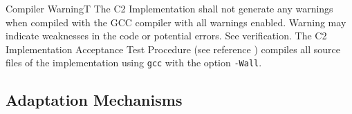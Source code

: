 \documentclass{pnp_article}
\begin{document}
\begin{fwReq}{Compiler Warning}{T}
{The C2 Implementation shall not generate any warnings when compiled with the GCC compiler with all warnings enabled.}
{Warning may indicate weaknesses in the code or potential errors.}
{See verification.} 
{The C2 Implementation Acceptance Test Procedure (see reference \cite{ref:C2Implementation}) compiles all source files of the implementation using \texttt{gcc} with the option \texttt{-Wall}.}
\end{fwReq}


\subsection{Adaptation Mechanisms}\label{req:adaptationMechanisms}
\end{document}
